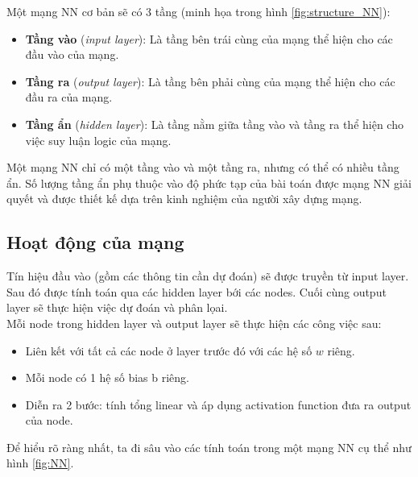 Một mạng NN cơ bản sẽ có 3 tầng (minh họa trong hình \ref{fig:structure_NN}):
\begin{itemize}
\item \textbf{Tầng vào} (\textit{input layer}): Là tầng bên trái cùng của mạng thể hiện cho các đầu vào của mạng.
\item \textbf{Tầng ra} (\textit{output layer}): Là tầng bên phải cùng của mạng thể hiện cho các đầu ra của mạng.
\item \textbf{Tầng ẩn} (\textit{hidden layer}): Là tầng nằm giữa tầng vào và tầng ra thể hiện cho việc suy luận logic của mạng.
\end{itemize}

Một mạng NN chỉ có một tầng vào và một tầng ra, nhưng có thể có nhiều tầng ẩn. Số lượng tầng ẩn phụ thuộc vào độ phức tạp của bài toán được mạng NN giải quyết và được thiết kế dựa trên kinh nghiệm của người xây dựng mạng.

\subsection{Hoạt động của mạng}
\label{hoat_dong_cua_mang}

Tín hiệu đầu vào (gồm các thông tin cần dự đoán) sẽ được truyền từ input layer. Sau đó được tính toán qua các hidden layer bới các nodes. Cuối cùng output layer sẽ thực hiện việc dự đoán và phân lọai.\\

Mỗi node trong hidden layer và output layer sẽ thực hiện các công việc sau:
\begin{itemize}
\item Liên kết với tất cả các node ở layer trước đó với các hệ số $w$ riêng.
\item Mỗi node có 1 hệ số bias b riêng.
\item Diễn ra 2 bước: tính tổng linear và áp dụng activation function đưa ra output của node.
\end{itemize}

Để hiểu rõ ràng nhất, ta đi sâu vào các tính toán trong một mạng NN cụ thể như hình \ref{fig:NN}.\\

